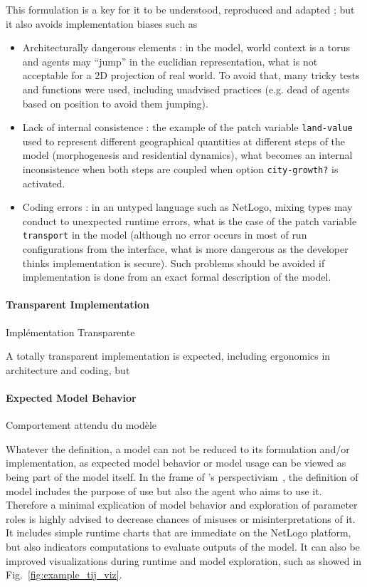 This formulation is a key for it to be understood, reproduced and adapted ; but it also avoids implementation biases such as
\begin{itemize}
\item Architecturally dangerous elements : in the model, world context is a torus and agents may ``jump'' in the euclidian representation, what is not acceptable for a 2D projection of real world. To avoid that, many tricky tests and functions were used, including unadvised practices (e.g. dead of agents based on position to avoid them jumping).
\item Lack of internal consistence : the example of the patch variable \texttt{land-value} used to represent different geographical quantities at different steps of the model (morphogenesis and residential dynamics), what becomes an internal inconsistence when both steps are coupled when option \texttt{city-growth?} is activated.
\item Coding errors : in an untyped language such as NetLogo, mixing types may conduct to unexpected runtime errors, what is the case of the patch variable \texttt{transport} in the model (although no error occurs in most of run configurations from the interface, what is more dangerous as the developer thinks implementation is secure). Such problems should be avoided if implementation is done from an exact formal description of the model.
\end{itemize}


\paragraph{Transparent Implementation}{Implémentation Transparente}

A totally transparent implementation is expected, including ergonomics in architecture and coding, but 


\paragraph{Expected Model Behavior}{Comportement attendu du modèle}

Whatever the definition, a model can not be reduced to its formulation and/or implementation, as expected model behavior or model usage can be viewed as being part of the model itself. In the frame of 's perspectivism~\cite{giere2010scientific}, the definition of model includes the purpose of use but also the agent who aims to use it. Therefore a minimal explication of model behavior and exploration of parameter roles is highly advised to decrease chances of misuses or misinterpretations of it. It includes simple runtime charts that are immediate on the NetLogo platform, but also indicators computations to evaluate outputs of the model. It can also be improved visualizations during runtime and model exploration, such as showed in Fig.~\ref{fig:example_tij_viz}.



